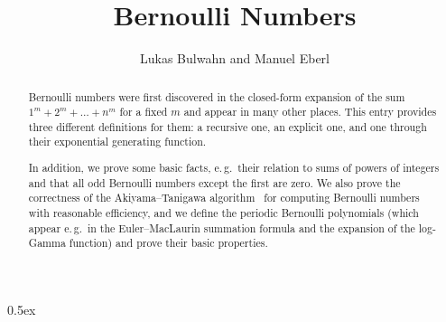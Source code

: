 \documentclass[11pt,a4paper]{article}
\begin{document}
\title{Bernoulli Numbers}
\author{Lukas Bulwahn and Manuel Eberl}
\maketitle

\begin{abstract}
Bernoulli numbers were first discovered in the closed-form expansion of 
the sum $1^m + 2^m + \ldots + n^m$ for a fixed $m$ and appear in many other places. This entry provides three different definitions for them: a recursive one, an explicit one, and one through their exponential generating function.

In addition, we prove some basic facts, e.\,g.\ their relation to sums of powers of integers and that all odd Bernoulli numbers except the first are zero. 
	We also prove the correctness of the Akiyama--Tanigawa algorithm~\cite{kaneko2000} for computing Bernoulli numbers with reasonable efficiency, and we define the periodic Bernoulli polynomials (which appear e.\,g.\ in the Euler--MacLaurin summation formula and the expansion of the log-Gamma function) and prove their basic properties.
\end{abstract}

\tableofcontents

\parindent 0pt\parskip 0.5ex




\begingroup
\raggedright

\endgroup
\end{document}
